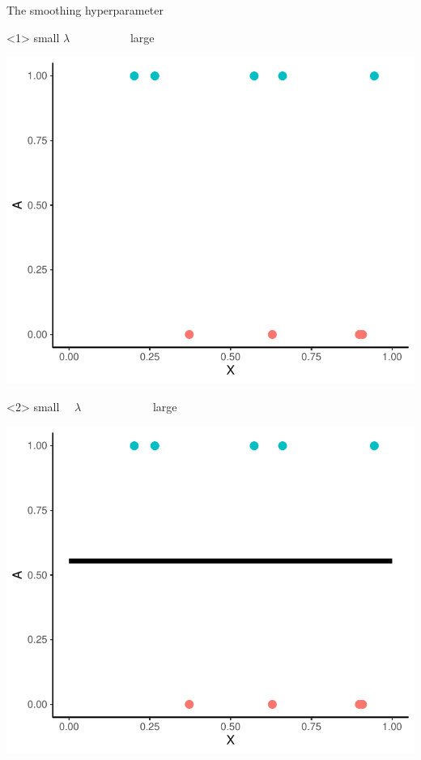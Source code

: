 \documentclass[smaller]{beamer}\usepackage{listings}
\begin{document}
\begin{frame}[label={sec:org990e36d}]{The smoothing hyperparameter}
\begin{onlyenv}<1>
\color{white}     \center small \(\lambda \quad \quad \quad \quad \quad\) large
\begin{center}
\includegraphics[width=.9\linewidth]{./hal-smoothing-dat.pdf}
\end{center}
\end{onlyenv}

\begin{onlyenv}<2>
\center small \(\quad \lambda \quad \quad \quad \quad \quad \quad\) large

\begin{center}
\includegraphics[width=.9\linewidth]{./hal-smoothing0.pdf}
\end{center}
\end{onlyenv}


\end{frame}
\end{document}
